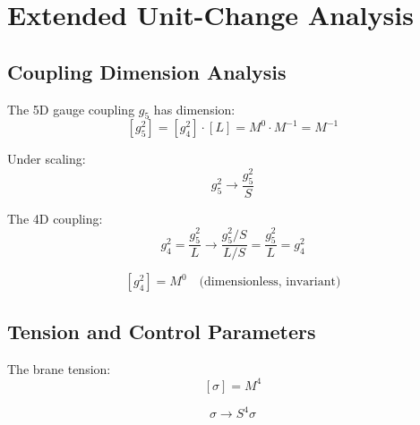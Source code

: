 \documentclass[11pt,a4paper]{article}
\theoremstyle{definition}
\begin{document}
\section{Extended Unit-Change Analysis}
\label{app:unit_extended2}

\subsection{Coupling Dimension Analysis}
\label{subsec:coupling_dim}

The 5D gauge coupling $g_5$ has dimension:
\begin{equation}
\label{eq:g5_dim_deriv}
[g_5^2] = [g_4^2] \cdot [L] = M^0 \cdot M^{-1} = M^{-1}
\end{equation}

Under scaling:
\begin{equation}
\label{eq:g5_scale_deriv}
g_5^2 \to \frac{g_5^2}{S}
\end{equation}

The 4D coupling:
\begin{equation}
\label{eq:g4_from_g5_scale}
g_4^2 = \frac{g_5^2}{L} \to \frac{g_5^2/S}{L/S} = \frac{g_5^2}{L} = g_4^2
\end{equation}

\begin{equation}
\label{eq:g4_invariant}
[g_4^2] = M^0 \quad \text{(dimensionless, invariant)}
\end{equation}

\subsection{Tension and Control Parameters}
\label{subsec:tension_dim}

The brane tension:
\begin{equation}
\label{eq:sigma_dim_deriv}
[\sigma] = M^4
\end{equation}

\begin{equation}
\label{eq:sigma_scale_deriv}
\sigma \to S^4 \sigma
\end{equation}
\end{document}
